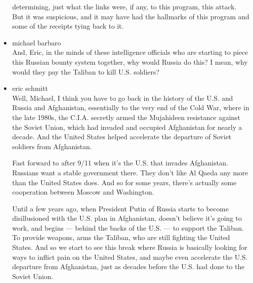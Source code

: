 \begin{itemize}
  determining, just what the links were, if any, to this program, this
  attack. But it was suspicious, and it may have had the hallmarks of
  this program and some of the receipts tying back to it.
\item
  michael barbaro\\
  And, Eric, in the minds of these intelligence officials who are
  starting to piece this Russian bounty system together, why would
  Russia do this? I mean, why would they pay the Taliban to kill U.S.
  soldiers?
\item
  eric schmitt\\
  Well, Michael, I think you have to go back in the history of the U.S.
  and Russia and Afghanistan, essentially to the very end of the Cold
  War, where in the late 1980s, the C.I.A. secretly armed the Mujahideen
  resistance against the Soviet Union, which had invaded and occupied
  Afghanistan for nearly a decade. And the United States helped
  accelerate the departure of Soviet soldiers from Afghanistan.

  Fast forward to after 9/11 when it's the U.S. that invades
  Afghanistan. Russians want a stable government there. They don't like
  Al Qaeda any more than the United States does. And so for some years,
  there's actually some cooperation between Moscow and Washington.

  Until a few years ago, when President Putin of Russia starts to become
  disillusioned with the U.S. plan in Afghanistan, doesn't believe it's
  going to work, and begins --- behind the backs of the U.S. --- to
  support the Taliban. To provide weapons, arms the Taliban, who are
  still fighting the United States. And so we start to see this break
  where Russia is basically looking for ways to inflict pain on the
  United States, and maybe even accelerate the U.S. departure from
  Afghanistan, just as decades before the U.S. had done to the Soviet
  Union.


\end{itemize}
